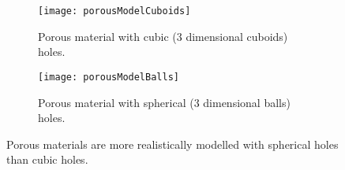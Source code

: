 \begin{figure}[!h]
	\vspace{4cm}
	\begin{subfigure}{0.44\linewidth}
		\texttt{[image: porousModelCuboids]}
		\centering
		\captionsetup{justification=centering}
		\caption{Porous material with cubic (3 dimensional cuboids) holes.}
		\label{fig:porousModelCuboids}
	\end{subfigure}
	\hspace{0.1\linewidth}
	\begin{subfigure}{0.44\linewidth}
		\texttt{[image: porousModelBalls]}
		\centering
		\captionsetup{justification=centering}
		\caption{Porous material with spherical (3 dimensional balls) holes.}
		\label{fig:porousModelBalls}
	\end{subfigure}
	\centering
	\caption{Porous materials are more realistically modelled with spherical holes than cubic holes.}
	\label{fig:porousModels}
\end{figure}
